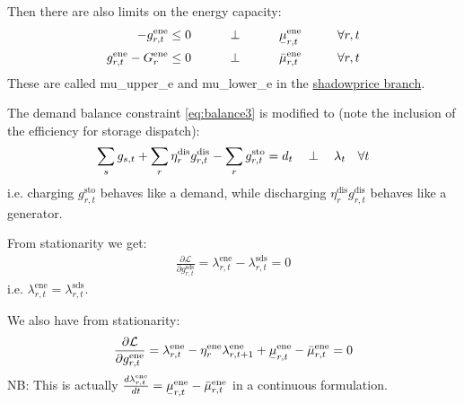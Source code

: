 \documentclass[final,3p,times]{elsarticle}
\newcommand{\ubar}[1]{\text{\b{$#1$}}}
\def\l{\lambda}
\def\d{\partial}
\def\cL{\mathcal{L}}
\begin{document}
Then there are also limits on the energy capacity:
\begin{align}
    -g^{\textrm{ene}}_{r,t}\leq 0 \hspace{1cm}\perp \hspace{1cm} \ubar{\mu}^{\textrm{ene}}_{r,t} \hspace{1cm} \forall r,t  \label{eq:storlower3}\\
    g^{\textrm{ene}}_{r,t} - G^{\textrm{ene}}_r \leq 0 \hspace{1cm}\perp \hspace{1cm} \bar{\mu}^{\textrm{ene}}_{r,t} \hspace{1cm} \forall r,t \label{eq:storupper3}
\end{align}
These are called mu\_upper\_e and mu\_lower\_e in the \href{https://github.com/PyPSA/PyPSA/blob/shadowprices/pypsa/linopf.py}{shadowprice branch}.


The demand balance constraint \eqref{eq:balance3} is modified to (note the inclusion of the efficiency for storage dispatch):
\begin{align}
   \sum_s g_{s,t} + \sum_r \eta^{\textrm{dis}}_r g^{\textrm{dis}}_{r,t} - \sum_r g^{\textrm{sto}}_{r,t}  =  d_t \hspace{0.34cm}\perp \hspace{0.34cm} \l_t \hspace{0.34cm} \forall t \label{eq:balance4}
\end{align}
i.e. charging $g^{\textrm{sto}}_{r,t}$ behaves like a demand, while discharging $\eta^{\textrm{dis}}_rg^{\textrm{dis}}_{r,t}$ behaves like a generator.

From stationarity we get:
\begin{align}
\frac{\d \cL}{\d g^{\textrm{sds}}_{r,t}} = \lambda^{\textrm{ene}}_{r,t} - \lambda^{\textrm{sds}}_{r,t} = 0
\end{align}
i.e. $\lambda^{\textrm{ene}}_{r,t} = \lambda^{\textrm{sds}}_{r,t}$.

We also have from stationarity:
\begin{align}
\frac{\d \cL}{\d g^{\textrm{ene}}_{r,t}} = \lambda^{\textrm{ene}}_{r,t} - \eta^{\textrm{ene}}_r\lambda^{\textrm{ene}}_{r,t+1} + \ubar{\mu}^{\textrm{ene}}_{r,t} -  \bar{\mu}^{\textrm{ene}}_{r,t} = 0
\end{align}
NB: This is actually $\frac{d \lambda^{\textrm{ene}}_{r,t}}{dt} = \ubar{\mu}^{\textrm{ene}}_{r,t} - \bar{\mu}^{\textrm{ene}}_{r,t}$ in a continuous formulation.
\end{document}
